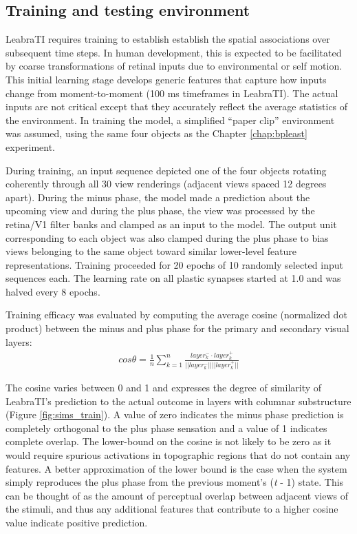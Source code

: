 \documentclass[dwyatte_dissertation.tex]{subfiles}
\begin{document}
\subsection{Training and testing environment}
LeabraTI requires training to establish establish the spatial associations over subsequent time steps. In human development, this is expected to be facilitated by coarse transformations of retinal inputs due to environmental or self motion. This initial learning stage develops generic features that capture how inputs change from moment-to-moment (100 ms timeframes in LeabraTI). The actual inputs are not critical except that they accurately reflect the average statistics of the environment. In training the model, a simplified  ``paper clip'' environment was assumed, using the same four objects as the Chapter \ref{chap:bpleast} experiment.

During training, an input sequence depicted one of the four objects rotating coherently through all 30 view renderings (adjacent views spaced 12 degrees apart). During the minus phase, the model made a prediction about the upcoming view and during the plus phase, the view was processed by the retina/V1 filter banks and clamped as an input to the model. The output unit corresponding to each object was also clamped during the plus phase to bias views belonging to the same object toward similar lower-level feature representations. Training proceeded for 20 epochs of 10 randomly selected input sequences each. The learning rate on all plastic synapses started at 1.0 and was halved every 8 epochs.

Training efficacy was evaluated by computing the average cosine (normalized dot product) between the minus and plus phase for the primary and secondary visual layers:
\begin{align*}
cos \theta = \frac{1}{n}\sum_{k=1}^{n}\frac{layer_k^- \cdot{} layer_k^+}{||layer_k^-||||layer_k^+||}
\end{align*}

The cosine varies between 0 and 1 and expresses the degree of similarity of LeabraTI's prediction to the actual outcome in layers with columnar substructure (Figure \ref{fig:sims_train}). A value of zero indicates the minus phase prediction is completely orthogonal to the plus phase sensation and a value of 1 indicates complete overlap. The lower-bound on the cosine is not likely to be zero as it would require spurious activations in topographic regions that do not contain any features. A better approximation of the lower bound is the case when the system simply reproduces the plus phase from the previous moment's (\textit{t} - 1) state. This can be thought of as the amount of perceptual overlap between adjacent views of the stimuli, and thus any additional features that contribute to a higher cosine value indicate positive prediction.
\end{document}
